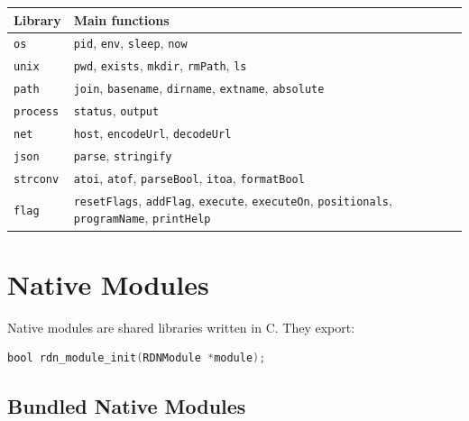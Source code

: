 \documentclass[11pt,a4paper]{article}
\newcommand{\code}[1]{\texttt{#1}}
\begin{document}
\begin{longtable}{ll}
\toprule
Library & Main functions \\
\midrule
\code{os} & \code{pid}, \code{env}, \code{sleep}, \code{now} \\
\code{unix} & \code{pwd}, \code{exists}, \code{mkdir}, \code{rmPath}, \code{ls} \\
\code{path} & \code{join}, \code{basename}, \code{dirname}, \code{extname}, \code{absolute} \\
\code{process} & \code{status}, \code{output} \\
\code{net} & \code{host}, \code{encodeUrl}, \code{decodeUrl} \\
\code{json} & \code{parse}, \code{stringify} \\
\code{strconv} & \code{atoi}, \code{atof}, \code{parseBool}, \code{itoa}, \code{formatBool} \\
\code{flag} & \code{resetFlags}, \code{addFlag}, \code{execute}, \code{executeOn}, \code{positionals}, \code{programName}, \code{printHelp} \\
\bottomrule
\end{longtable}

\section{Native Modules}

Native modules are shared libraries written in C. They export:

\begin{lstlisting}[language=C]
bool rdn_module_init(RDNModule *module);
\end{lstlisting}

\subsection{Bundled Native Modules}
\end{document}
